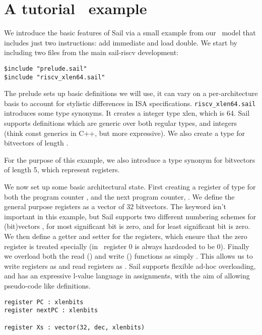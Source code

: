 \section{A tutorial \riscv\ example}
\label{sec:riscv}

We introduce the basic features of Sail via a small example from our
\riscv\ model that includes just two instructions: add immediate and
load double. We start by including two files from the main sail-riscv
development:

\begin{lstlisting}
$include "prelude.sail"
$include "riscv_xlen64.sail"
\end{lstlisting}

The prelude sets up basic definitions we will use, it can vary on a
per-architecture basis to account for stylistic differences in ISA
specifications. \texttt{riscv\_xlen64.sail} introduces some type
synonyms. It creates a integer type xlen, which is 64. Sail supports
definitions which are generic over both regular types, and integers
(think const generics in C++, but more expressive). We also create a
type  for bitvectors of length .


For the purpose of this example, we also introduce a type synonym for
bitvectors of length 5, which represent registers.


We now set up some basic architectural state. First creating a
register of type  for both the program counter , and
the next program counter, . We define the general purpose
registers as a vector of 32  bitvectors. The 
keyword isn't important in this example, but Sail supports two
different numbering schemes for (bit)vectors , for most
significant bit is zero, and  for least significant bit is
zero. We then define a getter and setter for the registers, which
ensure that the zero register is treated specially (in
\riscv\ register 0 is always hardcoded to be 0). Finally we overload
both the read () and write () functions as simply
. This allows us to write registers as  and
read registers as . Sail supports flexible ad-hoc
overloading, and has an expressive l-value language in assignments,
with the aim of allowing pseudo-code like definitions.

\begin{lstlisting}
register PC : xlenbits
register nextPC : xlenbits

register Xs : vector(32, dec, xlenbits)
\end{lstlisting}

